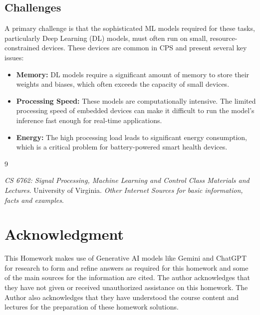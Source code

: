 \documentclass[a4paper,12pt]{article}
\begin{document}
\subsection{Challenges}
A primary challenge is that the sophisticated ML models required for these tasks, particularly Deep Learning (DL) models, must often run on small, resource-constrained devices. These devices are common in CPS and present several key issues:

\begin{itemize}
    \item \textbf{Memory:} DL models require a significant amount of memory to store their weights and biases, which often exceeds the capacity of small devices.
    \item \textbf{Processing Speed:} These models are computationally intensive. The limited processing speed of embedded devices can make it difficult to run the model's inference fast enough for real-time applications.
    \item \textbf{Energy:} The high processing load leads to significant energy consumption, which is a critical problem for battery-powered smart health devices.
\end{itemize}

\begin{thebibliography}{9}

     \textit{CS 6762: Signal Processing, Machine Learning and Control Class Materials and Lectures}. University of Virginia.
     \textit{Other Internet Sources for basic information, facts and examples}.
    
\end{thebibliography}

\section*{Acknowledgment}
This Homework makes use of  Generative AI models like Gemini and ChatGPT for research to form and refine answers as required for this homework and some of the main sources for the information are cited. The author acknowledges that they have not given or received unauthorized assistance on this homework. The Author also acknowledges that they have understood the course content and lectures for the preparation of these homework solutions.
\end{document}
